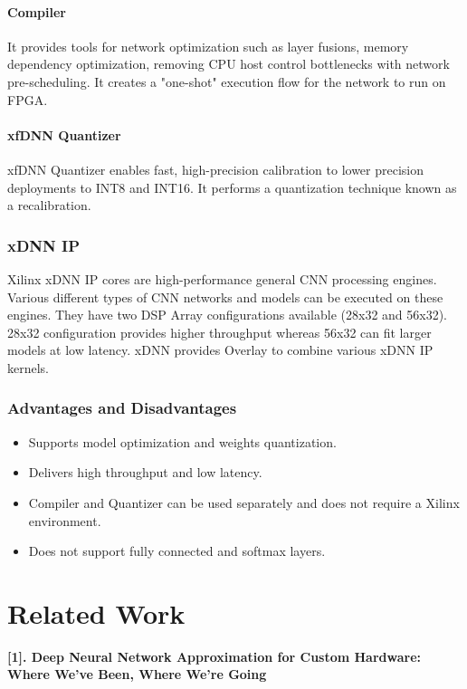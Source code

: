 \documentclass[titlepage]{report}
\begin{document}
\subsubsection{Compiler}

It provides tools for network optimization such as layer fusions, memory dependency optimization, removing CPU host control bottlenecks with network pre-scheduling. It creates a "one-shot" execution flow for the network to run on FPGA.

\subsubsection{xfDNN Quantizer} 

xfDNN Quantizer enables fast, high-precision calibration to lower precision deployments to INT8 and INT16. It performs a quantization technique known as a recalibration.

\subsection{xDNN IP}
Xilinx xDNN IP cores are high-performance general CNN processing engines. Various different types of CNN networks and models can be executed on these engines. They have two DSP Array configurations available (28x32 and 56x32). 28x32 configuration provides higher throughput whereas 56x32 can fit larger models at low latency.
xDNN provides Overlay to combine various xDNN IP kernels.

\subsection{Advantages and Disadvantages}
  
 \begin{itemize}
 \item Supports model optimization and weights quantization.
 \item Delivers high throughput and low latency.
 \item Compiler and Quantizer can be used separately and does not require a Xilinx environment.
 \item Does not support fully connected and softmax layers.
 
 \end{itemize}




\chapter{Related Work}
\textbf {[1]. Deep Neural Network Approximation for Custom Hardware: Where We've Been, Where We're Going} 
\end{document}

